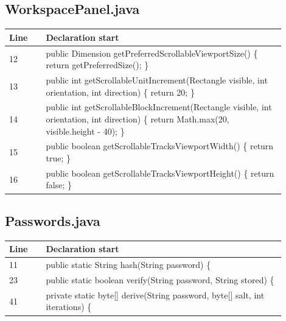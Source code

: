 \subsection*{WorkspacePanel.java}
\begin{longtable}{p{0.12\linewidth}p{0.78\linewidth}}\toprule Line & Declaration start\\\midrule\endhead
12 & public Dimension getPreferredScrollableViewportSize() \{ return getPreferredSize(); \}\\
13 & public int getScrollableUnitIncrement(Rectangle visible, int orientation, int direction) \{ return 20; \}\\
14 & public int getScrollableBlockIncrement(Rectangle visible, int orientation, int direction) \{ return Math.max(20, visible.height - 40); \}\\
15 & public boolean getScrollableTracksViewportWidth() \{ return true; \}\\
16 & public boolean getScrollableTracksViewportHeight() \{ return false; \}\\
\bottomrule\end{longtable}
\subsection*{Passwords.java}
\begin{longtable}{p{0.12\linewidth}p{0.78\linewidth}}\toprule Line & Declaration start\\\midrule\endhead
11 & public static String hash(String password) \{\\
23 & public static boolean verify(String password, String stored) \{\\
41 & private static byte[] derive(String password, byte[] salt, int iterations) \{\\
\bottomrule\end{longtable}
